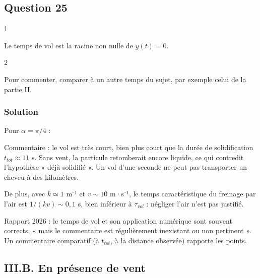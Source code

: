 \documentclass[11pt,a4paper]{article}
\newcommand{\equationajustee}[1]{%
  \sbox{\boiteequation}{$\displaystyle #1$}%
  \ifdim\wd\boiteequation>\linewidth
    \[\resizebox{\linewidth}{!}{\usebox{\boiteequation}}\]%
  \else
    \[#1\]%
  \fi}
\begin{document}
\hypertarget{question-25}{%
\subsection{Question 25}\label{question-25}}

\begin{indication}{1}

Le temps de vol est la racine non nulle de \(y(t) = 0\).

\end{indication}

\begin{indication}{2}

Pour commenter, comparer à un autre temps du sujet, par exemple celui de la partie II.

\end{indication}

\hypertarget{solution-24}{%
\subsubsection{Solution}\label{solution-24}}

\equationajustee{\boxed{\tau_{vol} = \frac{2v_0\sin\alpha}{g}}}

Pour \(\alpha = \pi/4\) :

\equationajustee{\tau_{vol} = \frac{2\times10\times\frac{\sqrt2}{2}}{10}\ \mathrm{s} = \sqrt2\ \mathrm{s} \approx 1{,}4\ \mathrm{s}}

Commentaire : le vol est très court, bien plus court que la durée de solidification \(t_{tot} \approx 11\) s. Sans vent, la particule retomberait encore liquide, ce qui contredit l'hypothèse « déjà solidifié ». Un vol d'une seconde ne peut pas transporter un cheveu à des kilomètres.

De plus, avec \(k \simeq 1\) m⁻¹ et \(v \sim 10\) m·s⁻¹, le temps caractéristique du freinage par l'air est \(1/(kv) \sim 0{,}1\) s, bien inférieur à \(\tau_{vol}\) : négliger l'air n'est pas justifié.

\begin{jury}

Rapport 2026 : le temps de vol et son application numérique sont souvent corrects, « mais le commentaire est régulièrement inexistant ou non pertinent ». Un commentaire comparatif (à \(t_{tot}\), à la distance observée) rapporte les points.

\end{jury}

\hypertarget{iii.b.-en-pruxe9sence-de-vent}{%
\subsection{III.B. En présence de vent}\label{iii.b.-en-pruxe9sence-de-vent}}
\end{document}
